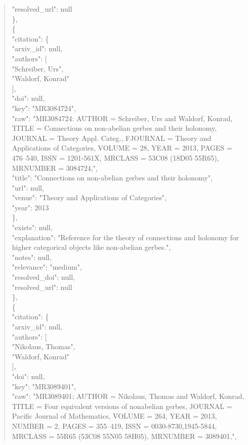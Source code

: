 \documentclass[11pt]{article}
\begin{document}
\begin{quote}
      "resolved\_url": null\\
    \},\\
    \{\\
      "citation": \{\\
        "arxiv\_id": null,\\
        "authors": [\\
          "Schreiber, Urs",\\
          "Waldorf, Konrad"\\
        ],\\
        "doi": null,\\
        "key": "MR3084724",\\
        "raw": "MR3084724: AUTHOR = Schreiber, Urs and Waldorf, Konrad, TITLE = Connections on non-abelian gerbes and their holonomy, JOURNAL = Theory Appl. Categ., FJOURNAL = Theory and Applications of Categories, VOLUME = 28, YEAR = 2013, PAGES = 476--540, ISSN = 1201-561X, MRCLASS = 53C08 (18D05 55R65), MRNUMBER = 3084724,",\\
        "title": "Connections on non-abelian gerbes and their holonomy",\\
        "url": null,\\
        "venue": "Theory and Applications of Categories",\\
        "year": 2013\\
      \},\\
      "exists": null,\\
      "explanation": "Reference for the theory of connections and holonomy for higher categorical objects like non-abelian gerbes.",\\
      "notes": null,\\
      "relevance": "medium",\\
      "resolved\_doi": null,\\
      "resolved\_url": null\\
    \},\\
    \{\\
      "citation": \{\\
        "arxiv\_id": null,\\
        "authors": [\\
          "Nikolaus, Thomas",\\
          "Waldorf, Konrad"\\
        ],\\
        "doi": null,\\
        "key": "MR3089401",\\
        "raw": "MR3089401: AUTHOR = Nikolaus, Thomas and Waldorf, Konrad, TITLE = Four equivalent versions of nonabelian gerbes, JOURNAL = Pacific Journal of Mathematics, VOLUME = 264, YEAR = 2013, NUMBER = 2, PAGES = 355--419, ISSN = 0030-8730,1945-5844, MRCLASS = 55R65 (53C08 55N05 58H05), MRNUMBER = 3089401,",\\

\end{quote}
\end{document}
